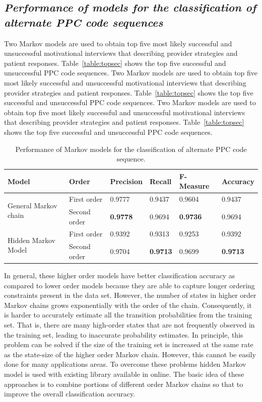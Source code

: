 \documentclass{amia}
\begin{document}
\subsection*{\textit{Performance of models for the classification of alternate PPC code sequences}}
Two Markov models are used to obtain top five most likely successful and unsuccessful motivational interviews that describing provider strategies and patient responses. Table~\ref{table:topsec} shows the top five successful and unsuccessful PPC code sequences. Two Markov models are used to obtain top five most likely successful and unsuccessful motivational interviews that describing provider strategies and patient responses. Table~\ref{table:topsec} shows the top five successful and unsuccessful PPC code sequences. Two Markov models are used to obtain top five most likely successful and unsuccessful motivational interviews that describing provider strategies and patient responses. Table~\ref{table:topsec} shows the top five successful and unsuccessful PPC code sequences. \\

\begin{table}[h]
\centering
\caption{Performance of Markov models for the classification of alternate PPC code sequence.}
\label{tab:result_alt_seq}
  \begin{tabular}{|l|l|l|l|l|l|}
  \hline
   \textbf{Model} & \textbf{Order}  & \textbf{Precision}  & \textbf{Recall} & \textbf{F-Measure} & \textbf{Accuracy}\\ \hline    
    
 \multirow{2}{*}{General Markov chain} & First order & 0.9777 & 0.9437 & 0.9604 & 0.9437\\\cline{2-6}
 & Second order & \textbf{0.9778} & 0.9694 & \textbf{0.9736} & 0.9694\\ \hline
 \multirow{2}{*}{Hidden Markov Model} & First order & 0.9392 & 0.9313 & 0.9253 & 0.9392\\ \cline{2-6}
 & Second order & 0.9704 & \textbf{0.9713} & 0.9699  & \textbf{0.9713}\\ \hline
 
  \end{tabular}
\end{table}

In general, these higher order models have better classification accuracy as compared to lower order models because they are able to capture longer ordering constraints present in the data set. However, the number of states in higher order Markov chains grows exponentially with the order of the chain. Consequently, it is harder to accurately estimate all the transition probabilities from the training set. That is, there are many high-order states that are not frequently observed in the training set, leading to inaccurate probability estimates. In principle, this problem can be solved if the size of the training set is increased at the same rate as the state-size of the higher order Markov chain. However, this cannot be easily done for many applications areas. To overcome these problems hidden Markov model is used with existing library available in online. The basic idea of these approaches is to combine portions of different order Markov chains so that to improve the overall classification accuracy.
\end{document}
